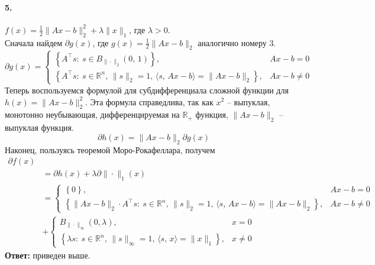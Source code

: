 \documentclass{article}
\newcommand*{\R}{\mathbb{R}}
\begin{document}
\paragraph{5.} $f(x) = \frac12 \| Ax - b \|_2^2 + \lambda \| x \|_1$, где $\lambda > 0$. \\
Сначала найдем $\partial g(x)$, где $g(x) = \frac12 \| Ax - b \|_2$ аналогично номеру 3.
\[ \partial g(x) = \begin{cases}
    \left\{ A^\top s :\: s \in B_{\| \cdot \|_2}(0,\, 1) \right\}, & Ax - b = 0 \\
    \left\{ A^\top s :\: s \in \R^n,\, \| s \|_2 = 1,\, \langle s,\, Ax - b \rangle = \| Ax - b \|_2 \right\}, & Ax - b \neq 0 
\end{cases} \]
Теперь воспользуемся формулой для субдифференциала сложной функции для $h(x) = \| Ax - b \|_2^2$. Эта формула справедлива, так как $x^2$ -- выпуклая, монотонно неубывающая, дифференцируемая на $\R_+$ функция, $\| Ax - b \|_2$ -- выпуклая функция.
\[ \partial h(x) = \| Ax - b \|_2 \partial g(x) \]
Наконец, пользуясь теоремой Моро-Рокафеллара, получем
\[ \begin{aligned}
    \partial f(x) \\
    &= \partial h(x) + \lambda \partial \| \cdot \|_1 (x) \\ 
    &= \begin{cases}    
        \left\{ 0 \right\}, & Ax - b = 0 \\
        \left\{ \| Ax - b \|_2 \cdot A^\top s :\: s \in \R^n,\, \| s \|_2 = 1,\, \langle s,\, Ax - b \rangle = \| Ax - b \|_2 \right\}, & Ax - b \neq 0 
    \end{cases} \\ 
    &+ \begin{cases}
        B_{\| \cdot \|_\infty}(0, \lambda), & x = 0 \\
        \left\{ \lambda s :\: s \in \R^n,\, \|s\|_\infty = 1,\, \langle s,\, x \rangle = \|x\|_1 \right\}, & x \neq 0
    \end{cases}
\end{aligned} \]
\textbf{Ответ:} приведен выше.
\end{document}
